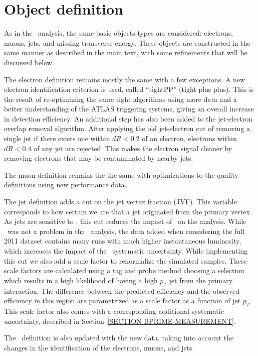 \section{Object definition}
\label{SECTION-BPRIME-OBJECTS}
As in the \Wt\ analysis, the same basic objects types are considered: electrons, muons, jets, and missing transverse energy. These objects are constructed in the same manner as described in the main text, with some refinements that will be discussed below.

The electron definition remains mostly the same with a few exceptions. A new electron identification criterion is used, called ``tightPP'' (tight plus plus). This is the result of re-optimizing the same tight algorithms using more data and a better understanding of the ATLAS triggering systems, giving an overall increase in detection efficiency. An additional step has also been added to the jet-electron overlap removal algorithm. After applying the old jet-electron cut of removing a single jet if there exists one within $dR < 0.2$ of an electron, electrons within $dR < 0.4$ of any jet are rejected. This makes the electron signal cleaner by removing electrons that may be contaminated by nearby jets.

The muon definition remains the the same with optimizations to the quality definitions using new performance data.

The jet definition adds a cut on the jet vertex fraction (JVF). This variable corresponds to how certain we are that a jet originated from the primary vertex. As jets are sensitive to \pileup, this cut reduces the impact of \pileup\ on the analysis. While \pileup\ was not a problem in the \Wt\ analysis, the data added when considering the full 2011 dataset contains many runs with much higher instantaneous luminosity, which increases the impact of the \pileup\ systematic uncertainty. While implementing this cut we also add a scale factor to renormalize the simulated samples. These scale factors are calculated using a tag and probe method choosing a selection which results in a high likelihood of having a high $p_T$ jet from the primary interaction. The difference between the predicted efficiency and the observed efficiency in this region are parametrized as a scale factor as a function of jet $p_T$. This scale factor also comes with a corresponding additional systematic uncertainty, described in Section~\ref{SECTION-BPRIME-MEASUREMENT}. 

The \MET\ definition is also updated with the new data, taking into account the changes in the identification of the electrons, muons, and jets. 

